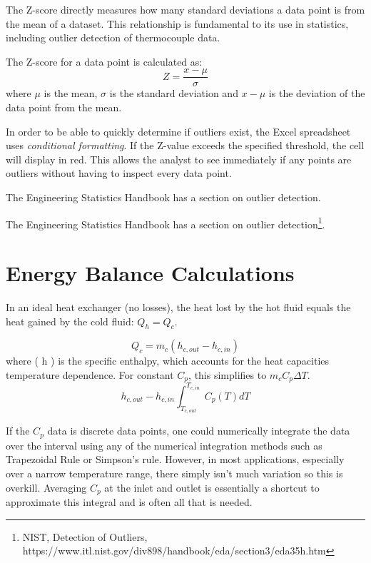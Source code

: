 \documentclass[12pt]{article}
\begin{document}
The Z-score directly measures how many standard deviations a data point is from the mean of a dataset. This relationship is fundamental to its use in statistics, including outlier detection of thermocouple data. 

The Z-score for a data point is calculated as:
\begin{equation}
Z=\frac{x-\mu}{\sigma}
\end{equation}
where $\mu$ is the mean, $\sigma$ is the standard deviation and  $x - \mu$ is the deviation of the data point from the mean.

In order to be able to quickly determine if outliers exist, the Excel spreadsheet uses \textit{conditional formatting}. If the Z-value exceeds the specified threshold, the cell will display in red. This allows the analyst to see immediately if any points are outliers without having to inspect every data point.

The Engineering Statistics Handbook has a section on outlier detection\cite{outlierDetection}.

The Engineering Statistics Handbook has a section on outlier detection\footnote{NIST, Detection of Outliers, https://www.itl.nist.gov/div898/handbook/eda/section3/eda35h.htm}.


\section{Energy Balance Calculations}
In an ideal heat exchanger (no losses), the heat lost by the hot fluid equals the heat gained by the cold fluid: $Q_h=Q_c$. 

\begin{equation}
	Q_c=m_c(h_{c,out}-h_{c,in})
\end{equation}
where ( h ) is the specific enthalpy, which accounts for the heat capacities temperature dependence. For constant $C_p$, this simplifies to $m_cC_p\Delta{T}$.
\begin{equation}
h_{c,out}-h_{c,in}\int_{T_{c,out}}^{T_{c,in}}C_p(T)dT
\end{equation}

If the $C_p$ data is discrete data points, one could numerically integrate the data over the interval using any of the numerical integration methods such as Trapezoidal Rule or Simpson's rule. However, in most applications, especially over a narrow temperature range, there simply isn't much variation so this is overkill. Averaging $C_p$ at the inlet and outlet is essentially a shortcut to approximate this integral and is often all that is needed.
\end{document}
